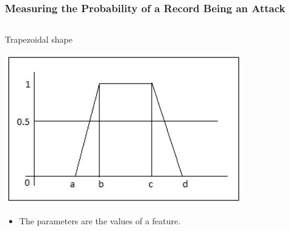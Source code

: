 \documentclass{beamer}
\begin{document}
\begin{frame}
  \frametitle{Measuring the Probability of a Record Being an Attack}

  \begin{columns}
  \begin{column}{0.4\textwidth}
  Trapezoidal shape
  
  \includegraphics[width=0.95\textwidth]{../trapFigure.jpg}
  
  \begin{itemize}
	\item The parameters are the values of a feature.
  \end{itemize}  
  
  \end{column}


  \begin{column}{0.6\textwidth}
  
\begin{algorithmic}
\ELSE {}
\ENDIF
\end{algorithmic}

  \end{column}
  \end{columns}
\end{frame}
\end{document}
